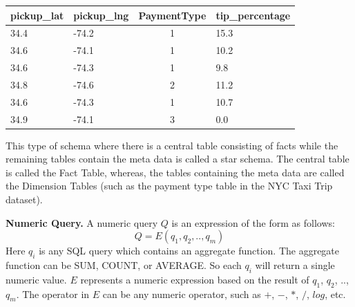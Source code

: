 \begin{center}
\small
  \begin{tabular}{ | l | l | c | l | }
    \hline
    \textbf{pickup\_lat} & \textbf{pickup\_lng} & \textbf{PaymentType} & \textbf{tip\_percentage} \\ \hline
    34.4 & -74.2 & 1 & 15.3 \\ \hline
    34.6 & -74.1 & 1 & 10.2 \\ \hline
    34.6 & -74.3 & 1 & 9.8 \\ \hline
    34.8 & -74.6 & 2 & 11.2 \\ \hline
    34.6 & -74.3 & 1 & 10.7 \\ \hline
    34.9 & -74.1 & 3 & 0.0 \\
    \hline
  \end{tabular}
\end{center}
\label{tbl:fact}

This type of schema where there is a central table consisting of facts while the remaining tables contain the meta data is called a star schema. The central table is called the Fact Table, whereas, the tables containing the meta data are called the Dimension Tables (such as the payment type table in the NYC Taxi Trip dataset).%



{\bf Numeric Query.} A numeric query $Q$ is an expression of the form as follows:
$$Q = E(q_1, q_2, .., q_m)$$
Here $q_i$ is any SQL query which contains an aggregate function. The aggregate function can be SUM, COUNT, or AVERAGE. So each $q_i$ will return a single numeric value. $E$ represents a numeric expression based on the result of $q_1$, $q_2$, .., $q_m$. The operator in $E$ can be any numeric operator, such as $+$, $-$, $*$, $/$, $log$, etc.

